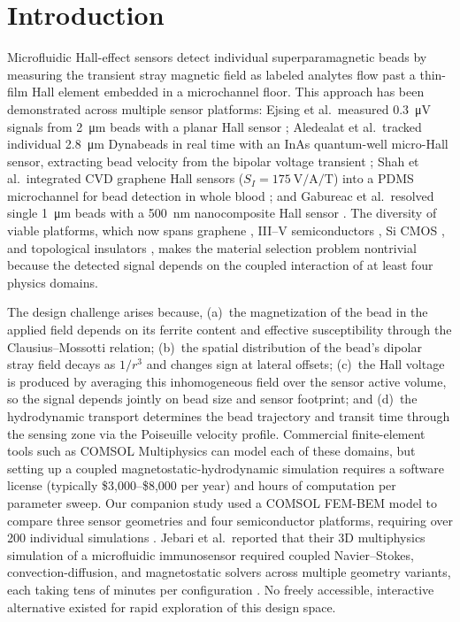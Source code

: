 \documentclass[preprint,review,12pt]{elsarticle}
\begin{document}
\linenumbers

\section{Introduction}
\label{sec:intro}

Microfluidic Hall-effect sensors detect individual superparamagnetic beads by measuring the transient stray magnetic field as labeled analytes flow past a thin-film Hall element embedded in a microchannel floor. This approach has been demonstrated across multiple sensor platforms: Ejsing et al.\ measured \SI{0.3}{\micro\volt} signals from \SI{2}{\micro\meter} beads with a planar Hall sensor \cite{ejsing2004}; Aledealat et al.\ tracked individual \SI{2.8}{\micro\meter} Dynabeads in real time with an InAs quantum-well micro-Hall sensor, extracting bead velocity from the bipolar voltage transient \cite{aledealat2009}; Shah et al.\ integrated CVD graphene Hall sensors ($S_I = \SI{175}{\volt\per\ampere\per\tesla}$) into a PDMS microchannel for bead detection in whole blood \cite{shah2023}; and Gabureac et al.\ resolved single \SI{1}{\micro\meter} beads with a \SI{500}{\nano\meter} nanocomposite Hall sensor \cite{gabureac2013}. The diversity of viable platforms, which now spans graphene \cite{dauber2015,kaidarova2021}, III--V semiconductors \cite{mihajlovic2005,gilbertson2011}, Si CMOS \cite{besse2002}, and topological insulators \cite{saeed2024}, makes the material selection problem nontrivial because the detected signal depends on the coupled interaction of at least four physics domains.

The design challenge arises because, (a)~the magnetization of the bead in the applied field depends on its ferrite content and effective susceptibility through the Clausius--Mossotti relation; (b)~the spatial distribution of the bead's dipolar stray field decays as $1/r^3$ and changes sign at lateral offsets; (c)~the Hall voltage is produced by averaging this inhomogeneous field over the sensor active volume, so the signal depends jointly on bead size and sensor footprint; and (d)~the hydrodynamic transport determines the bead trajectory and transit time through the sensing zone via the Poiseuille velocity profile. Commercial finite-element tools such as COMSOL Multiphysics can model each of these domains, but setting up a coupled magnetostatic-hydrodynamic simulation requires a software license (typically \$3{,}000--\$8{,}000 per year) and hours of computation per parameter sweep. Our companion study used a COMSOL FEM-BEM model to compare three sensor geometries and four semiconductor platforms, requiring over 200 individual simulations \cite{govindaraju2025}. Jebari et al.\ reported that their 3D multiphysics simulation of a microfluidic immunosensor required coupled Navier--Stokes, convection-diffusion, and magnetostatic solvers across multiple geometry variants, each taking tens of minutes per configuration \cite{jebari2024}. No freely accessible, interactive alternative existed for rapid exploration of this design space.
\end{document}

